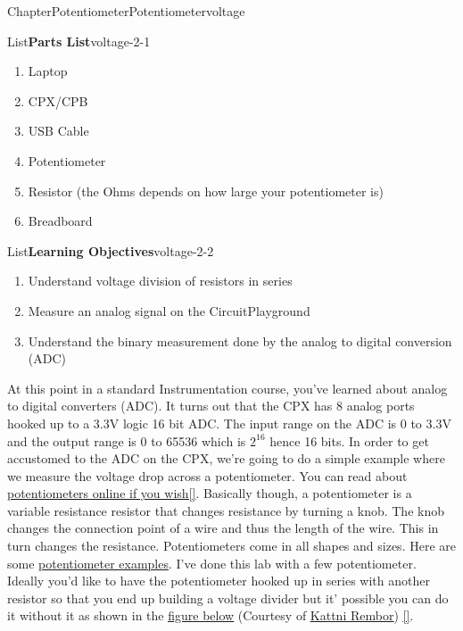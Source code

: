 \documentclass[oneside,10pt,]{book}
\newcommand{\xreffont}{\relax}
\newcommand{\linkhilite}[1]{\underline{#1}}
\numberwithin{equation}{section}
\begin{document}
\begin{chapterptx}{Chapter}{Potentiometer}{}{Potentiometer}{}{}{voltage}
\renewcommand*{\chaptername}{Chapter}
\begin{introduction}{}%
\begin{listptx}{List}{\textbf{Parts List}}{voltage-2-1}{}%
%
\begin{enumerate}
\item{}Laptop%
\item{}CPX\slash{}CPB%
\item{}USB Cable%
\item{}Potentiometer%
\item{}Resistor (the Ohms depends on how large your potentiometer is)%
\item{}Breadboard%
\end{enumerate}
\end{listptx}%
\begin{listptx}{List}{\textbf{Learning Objectives}}{voltage-2-2}{}%
%
\begin{enumerate}
\item{}Understand voltage division of resistors in series%
\item{}Measure an analog signal on the CircuitPlayground%
\item{}Understand the binary measurement done by the analog to digital conversion (ADC)%
\end{enumerate}
\end{listptx}%
At this point in a standard Instrumentation course, you've learned about analog to digital converters (ADC). It turns out that the CPX has 8 analog ports hooked up to a 3.3V logic 16 bit ADC. The input range on the ADC is 0 to 3.3V and the output range is 0 to 65536 which is \(2^{16}\) hence 16 bits. In order to get accustomed to the ADC on the CPX, we're going to do a simple example where we measure the voltage drop across a potentiometer. You can read about \href{https://www.build-electronic-circuits.com/potentiometer/}{\linkhilite{potentiometers online if you wish}}\hyperlink{potentiometerlearn}{\linkhilite{[{\xreffont 60}]}}. Basically though, a potentiometer is a variable resistance resistor that changes resistance by turning a knob. The knob changes the connection point of a wire and thus the length of the wire. This in turn changes the resistance. Potentiometers come in all shapes and sizes. Here are some \href{https://uk.rs-online.com/web/content/discovery/ideas-and-advice/potentiometers-guide}{\linkhilite{potentiometer examples}}. I've done this lab with a few potentiometer. Ideally you'd like to have the potentiometer hooked up in series with another resistor so that you end up building a voltage divider but it' possible you can do it without it as shown in the \href{https://learn.adafruit.com/sensor-plotting-with-mu-and-circuitpython/potentiometer}{\linkhilite{figure below}} (Courtesy of \href{https://learn.adafruit.com/u/kattni}{\linkhilite{Kattni Rembor}}) \hyperlink{potentiometer}{\linkhilite{[{\xreffont 38}]}}.%

\end{introduction}
\end{chapterptx}
\end{document}
